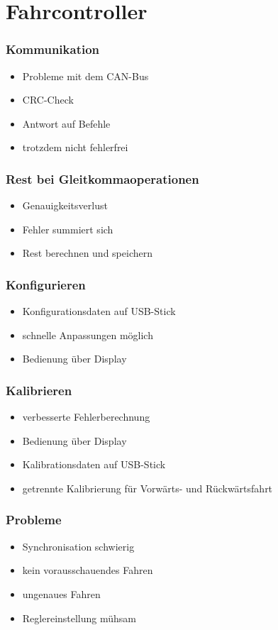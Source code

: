 \section{Fahrcontroller}


\begin{frame}
	\frametitle{Kommunikation}
	\begin{itemize}
		\item Probleme mit dem CAN-Bus
		\item CRC-Check
		\item Antwort auf Befehle
		\item trotzdem nicht fehlerfrei
	\end{itemize}
	\end{frame}

\begin{frame}
	\frametitle{Rest bei Gleitkommaoperationen}
	\begin{itemize}
		\item Genauigkeitsverlust
		\item Fehler summiert sich
		\item Rest berechnen und speichern
	\end{itemize}
\end{frame}

\begin{frame}
	\frametitle{Konfigurieren}
	\begin{itemize}
		\item Konfigurationsdaten auf USB-Stick
		\item schnelle Anpassungen möglich
		\item Bedienung über Display
	\end{itemize}
\end{frame}

\begin{frame}
	\frametitle{Kalibrieren}
	\begin{itemize}
		\item verbesserte Fehlerberechnung
		\item Bedienung über Display
		\item Kalibrationsdaten auf USB-Stick
		\item getrennte Kalibrierung für Vorwärts- und Rückwärtsfahrt
	\end{itemize}
\end{frame}

\begin{frame}
	\frametitle{Probleme}
	\begin{itemize}
		\item Synchronisation schwierig
		\item kein vorausschauendes Fahren
		\item ungenaues Fahren
		\item Reglereinstellung mühsam
	\end{itemize}
\end{frame}